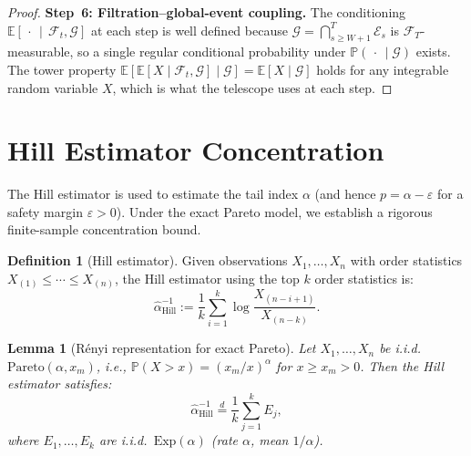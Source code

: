 \documentclass[11pt]{article}
\newtheorem{lemma}[theorem]{Lemma}
\theoremstyle{definition}
\newtheorem{definition}[theorem]{Definition}
\newcommand{\E}{\mathbb{E}}
\newcommand{\Prob}{\mathbb{P}}
\newcommand{\ahat}{\hat{\alpha}}
\newcommand{\Filt}{\mathcal{F}}
\begin{document}
\begin{proof}
\textbf{Step~6: Filtration--global-event coupling.}
The conditioning $\mathbb E[\,\cdot\,\mid\,\Filt_t,\mathcal G]$ at each step
is well defined because $\mathcal G = \bigcap_{s \geq W+1}^T \mathcal E_s$ is
$\Filt_T$-measurable, so a single regular conditional probability under
$\Prob(\,\cdot\,\mid\mathcal G)$ exists. The tower property
$\E[\E[X \mid \Filt_t,\mathcal G] \mid \mathcal G] = \E[X \mid \mathcal G]$
holds for any integrable random variable $X$, which is what the telescope
uses at each step.
\end{proof}


\section{Hill Estimator Concentration}
\label{sec:hill}

The Hill estimator is used to estimate the tail index $\alpha$ (and hence
$p = \alpha - \varepsilon$ for a safety margin $\varepsilon > 0$). Under
the exact Pareto model, we establish a rigorous finite-sample concentration bound.

\begin{definition}[Hill estimator]\label{def:hill}
Given observations $X_1, \ldots, X_n$ with order statistics
$X_{(1)} \leq \cdots \leq X_{(n)}$, the Hill estimator using the top $k$
order statistics is:
\[
  \ahat_{\mathrm{Hill}}^{-1}
  := \frac{1}{k}\sum_{i=1}^{k}\log\frac{X_{(n-i+1)}}{X_{(n-k)}}.
\]
\end{definition}

\begin{lemma}[R\'enyi representation for exact Pareto]\label{lem:renyi}
Let $X_1, \ldots, X_n$ be i.i.d.\ $\mathrm{Pareto}(\alpha, x_m)$, i.e.,
$\Prob(X > x) = (x_m/x)^\alpha$ for $x \geq x_m > 0$. Then the Hill
estimator satisfies:
\[
  \ahat_{\mathrm{Hill}}^{-1} \stackrel{d}{=} \frac{1}{k}\sum_{j=1}^{k} E_j,
\]
where $E_1, \ldots, E_k$ are i.i.d.\ $\mathrm{Exp}(\alpha)$ (rate $\alpha$,
mean $1/\alpha$).
\end{lemma}
\end{document}
